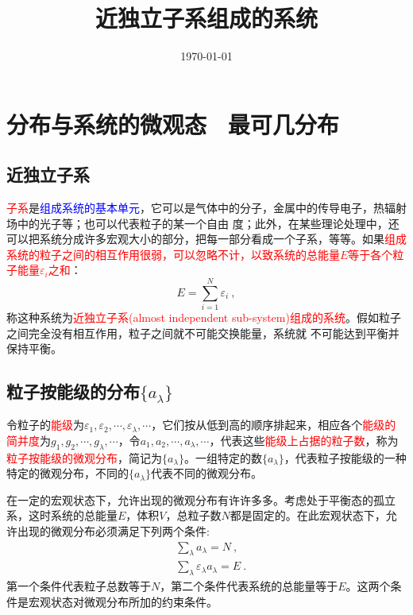 \documentclass[12pt,a4paper]{article}
\title{近独立子系组成的系统}
\author{}
\date{\today}
\begin{document}
\maketitle

\section{分布与系统的微观态 ~最可几分布}
\subsection{近独立子系}
\textcolor{red}{子系}是\textcolor{blue}{组成系统的基本单元}，它可以是气体中的分子，金属中的传导电子，热辐射场中的光子等；也可以代表粒子的某一个自由 度；此外，在某些理论处理中，还可以把系统分成许多宏观大小的部分，把每一部分看成一个子系，等等。如果\textcolor{red}{组成系统的粒子之间的相互作用很弱，可以忽略不计，以致系统的总能量$E$等于各个粒子能量$\varepsilon_i$之和}：
\begin{equation}
E = \sum\limits_{i=1}^N  \varepsilon_i ~,
\end{equation}
称这种系统为\textcolor{red}{近独立子系(almost independent sub-system)组成的系统}。假如粒子之间完全没有相互作用，粒子之间就不可能交换能量，系统就
不可能达到平衡并保持平衡。


\subsection{粒子按能级的分布$\{a_\lambda\}$}
令粒子的\textcolor{red}{能级}为$\varepsilon_1,  \varepsilon_2, \cdots,  \varepsilon_\lambda, \cdots$，它们按从低到高的顺序排起来，相应各个\textcolor{red}{能级的简并度}为$g_1,  g_2, \cdots,  g_\lambda, \cdots$，令$a_1,  a_2, \cdots,  a_\lambda, \cdots$，代表这些\textcolor{red}{能级上占据的粒子数}，称为\textcolor{red}{粒子按能级的微观分布}，简记为$\{a_\lambda \}$。一组特定的数$\{a_\lambda \}$，代表粒子按能级的一种特定的微观分布，不同的$\{a_\lambda \}$代表不同的微观分布。

在一定的宏观状态下，允许出现的微观分布有许许多多。考虑处于平衡态的孤立系，这时系统的总能量$E$，体积$V$，总粒子数$N$都是固定的。在此宏观状态下，允许出现的微观分布必须满足下列两个条件:
\begin{align}
& \sum_\lambda a_\lambda = N ~, \\
& \sum_\lambda \varepsilon_\lambda a_\lambda = E ~.
\end{align}
第一个条件代表粒子总数等于$N$，第二个条件代表系统的总能量等于$E$。这两个条件是宏观状态对微观分布所加的约束条件。
\end{document}
